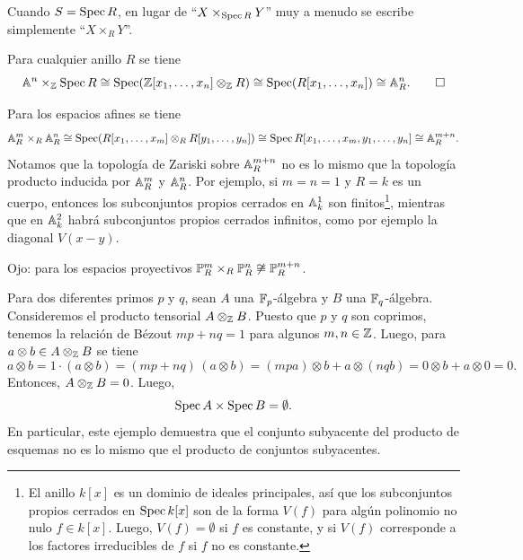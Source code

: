 \documentclass{article}
\numberwithin{equation}{section}
\theoremstyle{definition}
\begin{document}
\begin{comentario}
  Cuando $S = \Spec R$, en lugar de ``$X\times_{\Spec R} Y$'' muy a menudo se
  escribe simplemente ``$X\times_R Y$''.
\end{comentario}

\begin{ejemplo}
  Para cualquier anillo $R$ se tiene
  \[ \AA^n \times_\ZZ \Spec R \isom
     \Spec (\ZZ [x_1,\ldots,x_n] \otimes_\ZZ R) \isom
     \Spec (R [x_1,\ldots,x_n]) \isom \AA^n_R. \qedhere \]
\end{ejemplo}

\begin{ejemplo}
  Para los espacios afines se tiene
  $$\AA^m_R \times_R \AA^n_R \isom
    \Spec (R [x_1,\ldots,x_m] \otimes_R R [y_1,\ldots,y_n]) \isom
    \Spec R [x_1,\ldots,x_m,y_1,\ldots,y_n] \isom \AA^{m+n}_R.$$
  Notamos que la topología de Zariski sobre $\AA^{m+n}_R$ no es lo mismo que
  la topología producto inducida por $\AA^m_R$ y $\AA^n_R$. Por ejemplo,
  si $m=n=1$ y $R = k$ es un cuerpo, entonces los subconjuntos propios cerrados
  en $\AA^1_k$ son finitos\footnote{El anillo $k [x]$ es un dominio de ideales
    principales, así que los subconjuntos propios cerrados en $\Spec k [x]$ son
    de la forma $V (f)$ para algún polinomio no nulo $f \in k [x]$. Luego,
    $V (f) = \emptyset$ si $f$ es constante, y si $V (f)$ corresponde a los
    factores irreducibles de $f$ si $f$ no es constante.}, mientras que en
  $\AA^2_k$ habrá subconjuntos propios cerrados infinitos, como por ejemplo
  la diagonal $V (x-y)$.

  Ojo: para los espacios proyectivos
  $\PP^m_R \times_R \PP^n_R \not\isom \PP^{m+n}_R$.
\end{ejemplo}

\begin{ejemplo}
  \label{ejemplo:producto-fibrado-diferente-car}
  Para dos diferentes primos $p$ y $q$, sean $A$ una $\FF_p$-álgebra y $B$ una
  $\FF_q$-álgebra. Consideremos el producto tensorial $A\otimes_\ZZ B$. Puesto
  que $p$ y $q$ son coprimos, tenemos la relación de Bézout $mp + nq = 1$ para
  algunos $m,n\in \ZZ$. Luego, para $a\otimes b \in A\otimes_\ZZ B$ se tiene
  \[ a\otimes b = 1\cdot (a\otimes b) = (mp + nq)\,(a\otimes b) =
     (mpa)\otimes b + a\otimes (nqb) = 0\otimes b + a\otimes 0 = 0. \]
  Entonces, $A\otimes_\ZZ B = 0$. Luego,
  $$\Spec A \times \Spec B = \emptyset.$$
  En particular, este ejemplo demuestra que el conjunto subyacente del producto
  de esquemas no es lo mismo que el producto de conjuntos subyacentes.
\end{ejemplo}
\end{document}

